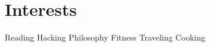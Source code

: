 \section*{Interests}
Reading \vline{}
Hacking \vline{}
Philosophy \vline{}
Fitness \vline{}
Traveling \vline{}
Cooking
